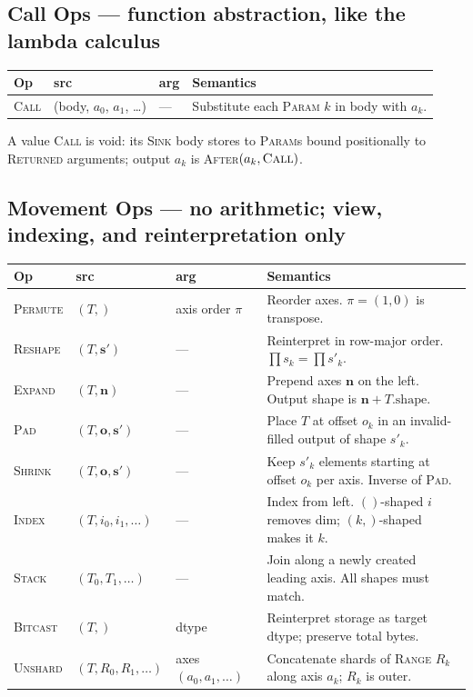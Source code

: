 \documentclass[10pt,letterpaper]{article}
\newcommand{\op}[1]{\textsc{#1}}
\begin{document}
\subsection*{{\color{callblue}Call Ops} \normalfont\small--- function abstraction, like the lambda calculus}

\begin{tabular}{@{}l l l l@{}}
\toprule
\textbf{Op} & \textbf{src} & \textbf{arg} & \textbf{Semantics} \\
\midrule
\op{Call} & (body, $a_0$, $a_1$, \ldots) & --- & Substitute each \op{Param} $k$ in body with $a_k$. \\
\bottomrule
\end{tabular}

\smallskip
A value \op{Call} is void: its \op{Sink} body stores to \op{Param}s bound positionally to \op{Returned} arguments; output $a_k$ is \op{After}$(a_k, \op{Call})$.

\subsection*{{\color{movgreen}Movement Ops} \normalfont\small--- no arithmetic; view, indexing, and reinterpretation only}

\begin{tabular}{@{}l l l l@{}}
\toprule
\textbf{Op} & \textbf{src} & \textbf{arg} & \textbf{Semantics} \\
\midrule
\op{Permute} & $(T,)$ & axis order $\pi$ & Reorder axes. $\pi = (1,0)$ is transpose. \\
\op{Reshape} & $(T, \mathbf{s'})$ & --- & Reinterpret in row-major order. $\prod s_k = \prod s'_k$. \\
\op{Expand} & $(T, \mathbf{n})$ & --- & Prepend axes $\mathbf{n}$ on the left. Output shape is $\mathbf{n} + T.\mathrm{shape}$. \\
\op{Pad} & $(T, \mathbf{o}, \mathbf{s'})$ & --- & Place $T$ at offset $o_k$ in an invalid-filled output of shape $s'_k$. \\
\op{Shrink} & $(T, \mathbf{o}, \mathbf{s'})$ & --- & Keep $s'_k$ elements starting at offset $o_k$ per axis. Inverse of \op{Pad}. \\
\op{Index} & $(T, i_0, i_1, \ldots)$ & --- & Index from left. $()$-shaped $i$ removes dim; $(k,)$-shaped makes it $k$. \\
\op{Stack} & $(T_0, T_1, \ldots)$ & --- & Join along a newly created leading axis. All shapes must match. \\
\op{Bitcast} & $(T,)$ & dtype & Reinterpret storage as target dtype; preserve total bytes. \\
\op{Unshard} & $(T, R_0, R_1, \ldots)$ & axes $(a_0, a_1, \ldots)$ & Concatenate shards of \op{Range} $R_k$ along axis $a_k$; $R_k$ is outer. \\
\bottomrule
\end{tabular}
\end{document}
